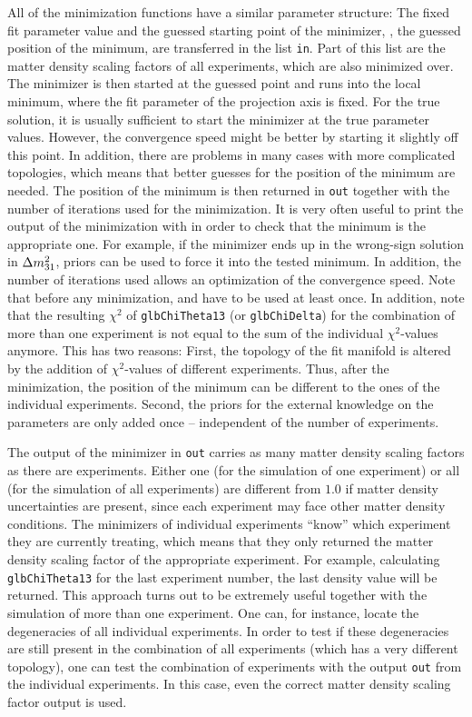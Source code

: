 All of the minimization functions have a similar parameter structure: The fixed fit parameter value and the guessed starting point of the minimizer, \ie, the guessed position of the minimum, are transferred in the list {\tt in}. Part of this list are the matter density
scaling factors of all experiments, which are also minimized over. 
The minimizer is then started at the guessed point and runs into
the local minimum, where the fit parameter of the projection
axis is fixed. For the true solution, it is usually sufficient to start 
the minimizer at the true parameter values. However, the convergence 
speed might
be better by starting it slightly off this point. In addition, there
are problems in many cases with more complicated topologies, which means
that better guesses for the position of the minimum are needed.
The position of the minimum is then returned in {\tt out}
together with the number of iterations used for the minimization.
It is very often useful to print the output of the minimization with
 in order to check that the minimum is the
appropriate one. For example, if the minimizer ends up in the wrong-sign
solution in $\Delta m_{31}^2$, priors can be used to force it into the tested
minimum. In addition, the number of iterations used allows an optimization
of the convergence speed. 
% 
Note that before any minimization,  
and  have to be used at least once. In addition, note that the resulting $\chi^2$ of {\tt glbChiTheta13} (or {\tt glbChiDelta}) for the combination of more than one experiment is not 
equal to the sum of the individual $\chi^2$-values anymore. This has two reasons: First, the topology of the fit manifold is altered by the addition of $\chi^2$-values of different experiments. Thus, after the minimization, the position of the minimum can be different to the ones of the individual experiments. Second, the priors for the external knowledge on the parameters are only added once -- independent of the number of experiments.

The output of the minimizer in {\tt out} carries as many matter density scaling factors as there are experiments. Either
one (for the simulation of one experiment) or all (for the simulation of
all experiments) are different from $1.0$ if matter density uncertainties
are present, since each experiment may face other matter density conditions. 
The minimizers of individual experiments ``know'' which
experiment they are currently treating, which means that they only returned the
matter density scaling factor of the appropriate experiment.
For example, calculating {\tt glbChiTheta13} for the last experiment
number, the last density value will be returned.
This approach turns out to be extremely useful together with the
simulation of more than one experiment. One can, for instance, locate the
degeneracies of all individual experiments. In order to test if
these degeneracies are still present in the combination of all experiments (which has a very different topology), one can test the combination of experiments with the output {\tt out} from the individual experiments. In this case, even the correct matter density scaling factor
output is used. 

